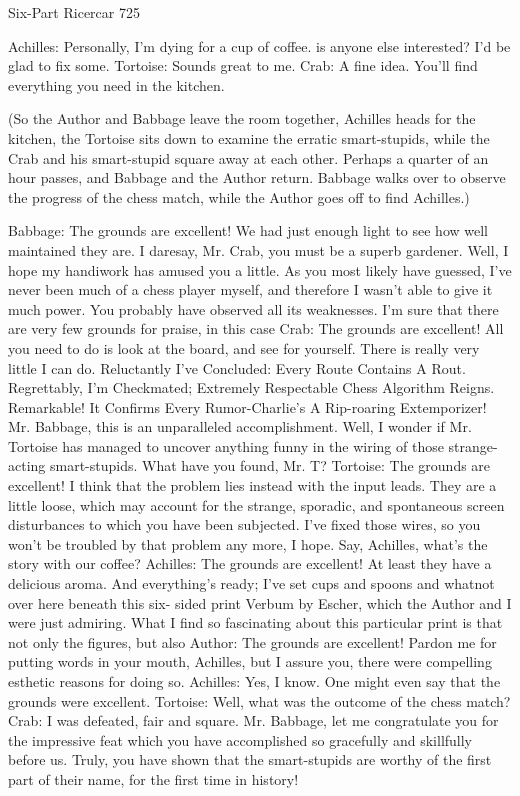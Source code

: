 Six-Part Ricercar                                                                     725

Achilles: Personally, I'm dying for a cup of coffee. is anyone else interested? I'd be glad
  to fix some.
Tortoise: Sounds great to me.
Crab: A fine idea. You'll find everything you need in the kitchen.

  (So the Author and Babbage leave the room together, Achilles heads for the kitchen,
  the Tortoise sits down to examine the erratic smart-stupids, while the Crab and his
  smart-stupid square away at each other. Perhaps a quarter of an hour passes, and
  Babbage and the Author return. Babbage walks over to observe the progress of the
  chess match, while the Author goes off to find Achilles.)

Babbage: The grounds are excellent! We had just enough light to see how well
  maintained they are. I daresay, Mr. Crab, you must be a superb gardener. Well, I hope
  my handiwork has amused you a little. As you most likely have guessed, I've never
  been much of a chess player myself, and therefore I wasn't able to give it much power.
  You probably have observed all its weaknesses. I'm sure that there are very few
  grounds for praise, in this case
Crab: The grounds are excellent! All you need to do is look at the board, and see for
  yourself. There is really very little I can do. Reluctantly I've Concluded: Every Route
  Contains A Rout. Regrettably, I'm Checkmated; Extremely Respectable Chess
  Algorithm Reigns. Remarkable! It Confirms Every Rumor-Charlie's A Rip-roaring
  Extemporizer! Mr. Babbage, this is an unparalleled accomplishment. Well, I wonder if
  Mr. Tortoise has managed to uncover anything funny in the wiring of those strange-
  acting smart-stupids. What have you found, Mr. T?
Tortoise: The grounds are excellent! I think that the problem lies instead with the input
  leads. They are a little loose, which may account for the strange, sporadic, and
  spontaneous screen disturbances to which you have been subjected. I've fixed those
  wires, so you won't be troubled by that problem any more, I hope. Say, Achilles,
  what's the story with our coffee?
Achilles: The grounds are excellent! At least they have a delicious aroma. And
  everything's ready; I've set cups and spoons and whatnot over here beneath this six-
  sided print Verbum by Escher, which the Author and I were just admiring. What I find
  so fascinating about this particular print is that not only the figures, but also
Author: The grounds are excellent! Pardon me for putting words in your mouth, Achilles,
  but I assure you, there were compelling esthetic reasons for doing so.
Achilles: Yes, I know. One might even say that the grounds were excellent.
Tortoise: Well, what was the outcome of the chess match?
Crab: I was defeated, fair and square. Mr. Babbage, let me congratulate you for the
  impressive feat which you have accomplished so gracefully and skillfully before us.
  Truly, you have shown that the smart-stupids are worthy of the first part of their name,
  for the first time in history!




